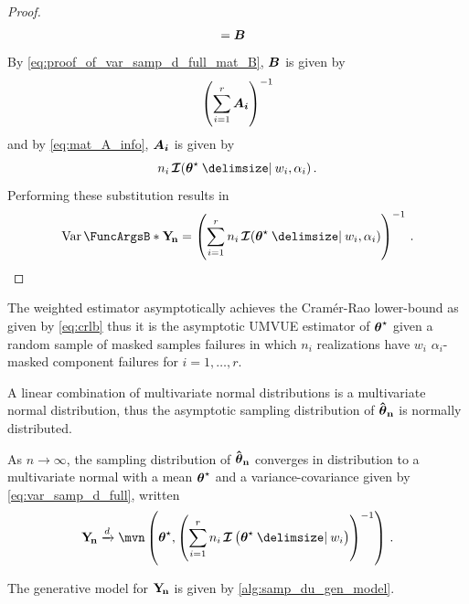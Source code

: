 \documentclass[
    11pt,
    extrafontsizes,
    article,
    oldfontcommands,
    final,
    oneside,
    openany,
    hidelinks]{memoir}
\begin{document}
\begin{proof}
\begin{align}
        &= \boldsymbol{B}
\end{align}
By \cref{eq:proof_of_var_samp_d_full_mat_B}, $\boldsymbol{B}$ is given by
\begin{equation}
    \left( \sum_{i=1}^{r} \boldsymbol{A_i} \right)^{-1}
\end{equation}
and by \cref{eq:mat_A_info}, $\boldsymbol{A_i}$ is given by
\begin{equation}
    n_i \infomatrx(\tparam\sysparamvec \Given w_i, \alpha_i)\,.
\end{equation}
Performing these substitution results in
\begin{equation}
    \Var{\sampdu} = \left( \sum_{i=1}^{r} n_i \infomatrx(\tparam\sysparamvec \Given w_i, \alpha_i) \right)^{-1}\,.
\end{equation}
\end{proof}

The weighted estimator asymptotically achieves the Cram\'{e}r-Rao lower-bound as given by \cref{eq:crlb} thus it is the asymptotic UMVUE estimator of ${\boldsymbol{\mathbf{\theta}}}^{\star}$ given a random sample of masked samples failures in which $n_i$ realizations have $w_i$ $\alpha_i$-masked component failures for $i=1,\ldots,r$.

A linear combination of multivariate normal distributions is a multivariate normal distribution, thus the asymptotic sampling distribution of $\boldsymbol{\mathbf{\hat{\boldsymbol{\mathbf{\theta}}}_{n}}}$ is normally distributed.
\begin{postulate}
\label{def:converge_in_dist_full}
As $n \to \infty$, the sampling distribution of $\boldsymbol{\mathbf{\hat{\boldsymbol{\mathbf{\theta}}}_{n}}}$ converges in distribution to a multivariate normal with a mean ${\boldsymbol{\mathbf{\theta}}}^{\star}$ and a variance-covariance given by \cref{eq:var_samp_d_full}, written
\begin{equation}
\label{eq:converge_in_dist_weighted}
    \sampdu \xrightarrow{d} \mvn\left(\tparam\sysparamvec, \left(\sum_{i=1}^{r} n_i \infomatrx\left(\tparam\sysparamvec \Given w_i \right)\right)^{-1}\right)\,.
\end{equation}
\end{postulate}

The generative model for $\mathrm{\boldsymbol{\mathbf{Y_{\!n}}}}$ is given by \cref{alg:samp_du_gen_model}.
\begin{algorithm}
    \DontPrintSemicolon
    \BlankLine
\caption{Generative model of maximum likelihood estimator}
\label{alg:samp_du_gen_model}
\end{algorithm}
\end{document}
